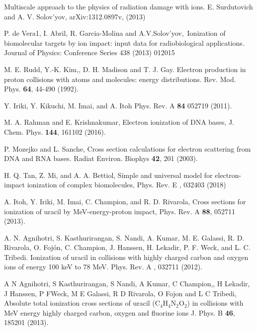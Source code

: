 \documentclass[preprint,showpacs]{revtex4}
\begin{document}
\begin{thebibliography}{99}
Multiscale approach to the physics of radiation
damage with ions. E. Surdutovich and A. V. Solov'yov, 
arXiv:1312.0897v, (2013)

P. de Vera1, I. Abril, R. Garcia-Molina and
A.V.Solov'yov,\ Ionization of biomolecular targets by ion impact: input data
for radiobiological applications. 
Journal of Physics: Conference Series 438
(2013) 012015

M. E. Rudd, Y.-K. Kim,, D. H. Madison and T. J. Gay.
Electron production in proton collisions with atoms and molecules: energy
distributions. 
Rev. Mod. Phys. \textbf{64}, 44-490 (1992).



Y. Iriki, Y. Kikuchi, M. Imai, and A. Itoh
Phys. Rev. A \textbf{84} 052719 (2011).

M. A. Rahman and E. Krishnakumar,
Electron ionization of DNA bases,
J. Chem. Phys. \textbf{144}, 161102 (2016).

P. Mozejko and L. Sanche, 
Cross section calculations for electron scattering from DNA and RNA bases.
Radiat Environ. Biophys \textbf{42}, 201 (2003).

H. Q. Tan, Z. Mi, and A. A. Bettiol, 
Simple and universal model for electron-impact ionization of complex 
biomolecules, 
Phys. Rev. E , 032403 (2018)

A. Itoh, Y. Iriki, M. Imai, C. Champion, and R. D. Rivarola, 
Cross sections for ionization of uracil by MeV-energy-proton impact, 
Phys. Rev. A \textbf{88}, 052711 (2013).


A. N. Agnihotri, S. Kasthurirangan, S. Nandi, A.
Kumar, M. E. Galassi, R. D. Rivarola, O. Foj\'{o}n, C. Champion, J. Hanssen,
H. Lekadir, P. F. Weck, and L. C. Tribedi. 
Ionization of uracil in collisions with highly charged carbon and oxygen 
ions of energy 100 keV to 78 MeV. 
Phys. Rev. A , 032711 (2012).

A N Agnihotri, S Kasthurirangan, S Nandi, A Kumar, C Champion,, H Lekadir, 
J Hanssen, P FWeck, M E Galassi, R D Rivarola, O Fojon and L C Tribedi, 
Absolute total ionization cross sections of uracil (C$_4$H$_4$N$_2$O$_2$) in 
collisions with MeV energy highly charged carbon, oxygen and fluorine ions
J. Phys. B \textbf{46}, 185201 (2013).


\end{thebibliography}
\end{document}
